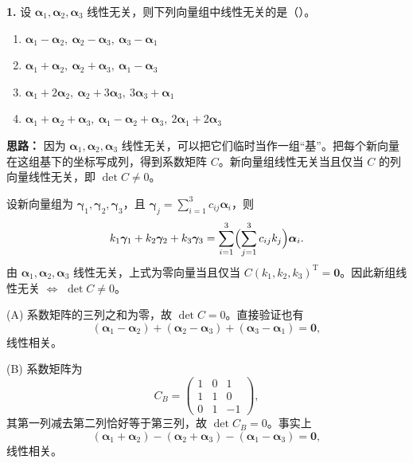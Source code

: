 \textbf{1.} 设 $\boldsymbol{\alpha}_1,\boldsymbol{\alpha}_2,\boldsymbol{\alpha}_3$ 线性无关，则下列向量组中线性无关的是（\quad）。
\begin{enumerate}[label=(\Alph*)]
    \item $\boldsymbol{\alpha}_1-\boldsymbol{\alpha}_2,\ \boldsymbol{\alpha}_2-\boldsymbol{\alpha}_3,\ \boldsymbol{\alpha}_3-\boldsymbol{\alpha}_1$
    \item $\boldsymbol{\alpha}_1+\boldsymbol{\alpha}_2,\ \boldsymbol{\alpha}_2+\boldsymbol{\alpha}_3,\ \boldsymbol{\alpha}_1-\boldsymbol{\alpha}_3$
    \item $\boldsymbol{\alpha}_1+2\boldsymbol{\alpha}_2,\ \boldsymbol{\alpha}_2+3\boldsymbol{\alpha}_3,\ 3\boldsymbol{\alpha}_3+\boldsymbol{\alpha}_1$
    \item $\boldsymbol{\alpha}_1+\boldsymbol{\alpha}_2+\boldsymbol{\alpha}_3,\ \boldsymbol{\alpha}_1-\boldsymbol{\alpha}_2+\boldsymbol{\alpha}_3,\ 2\boldsymbol{\alpha}_1+2\boldsymbol{\alpha}_3$
\end{enumerate}

\ifshowsolutions%
\quad
\textbf{思路：} 因为 $\boldsymbol{\alpha}_1,\boldsymbol{\alpha}_2,\boldsymbol{\alpha}_3$ 线性无关，可以把它们临时当作一组“基”。把每个新向量在这组基下的坐标写成列，得到系数矩阵 $C$。新向量组线性无关当且仅当 $C$ 的列向量线性无关，即 $\det C\neq 0$。

设新向量组为 $\boldsymbol{\gamma}_1,\boldsymbol{\gamma}_2,\boldsymbol{\gamma}_3$，且 $\boldsymbol{\gamma}_j=\sum_{i=1}^{3}c_{ij}\boldsymbol{\alpha}_i$，则
\[
k_1\boldsymbol{\gamma}_1+k_2\boldsymbol{\gamma}_2+k_3\boldsymbol{\gamma}_3
=\sum_{i=1}^{3}\Bigl(\sum_{j=1}^{3}c_{ij}k_j\Bigr)\boldsymbol{\alpha}_i.
\]
由 $\boldsymbol{\alpha}_1,\boldsymbol{\alpha}_2,\boldsymbol{\alpha}_3$ 线性无关，上式为零向量当且仅当 $C(k_1,k_2,k_3)^\mathrm{T}=\boldsymbol{0}$。因此新组线性无关 $\Leftrightarrow$ $\det C\neq 0$。

(A) 系数矩阵的三列之和为零，故 $\det C=0$。直接验证也有
\[
(\boldsymbol{\alpha}_1-\boldsymbol{\alpha}_2)+(\boldsymbol{\alpha}_2-\boldsymbol{\alpha}_3)+(\boldsymbol{\alpha}_3-\boldsymbol{\alpha}_1)=\boldsymbol{0},
\]
线性相关。

(B) 系数矩阵为
\[
C_B=\begin{pmatrix}1&0&1\\1&1&0\\0&1&-1\end{pmatrix},
\]
其第一列减去第二列恰好等于第三列，故 $\det C_B=0$。事实上
\[
(\boldsymbol{\alpha}_1+\boldsymbol{\alpha}_2)-(\boldsymbol{\alpha}_2+\boldsymbol{\alpha}_3)-(\boldsymbol{\alpha}_1-\boldsymbol{\alpha}_3)=\boldsymbol{0},
\]
线性相关。

